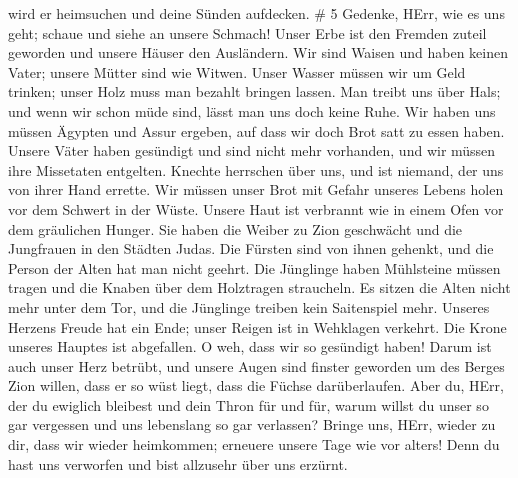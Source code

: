 wird er heimsuchen und deine Sünden aufdecken. \# 5 
Gedenke, HErr, wie es uns geht; schaue und siehe an unsere Schmach!
 Unser Erbe ist den Fremden zuteil geworden und unsere
Häuser den Ausländern.  Wir sind Waisen und haben keinen
Vater; unsere Mütter sind wie Witwen.  Unser Wasser müssen
wir um Geld trinken; unser Holz muss man bezahlt bringen lassen.
 Man treibt uns über Hals; und wenn wir schon müde sind,
lässt man uns doch keine Ruhe.  Wir haben uns müssen Ägypten
und Assur ergeben, auf dass wir doch Brot satt zu essen haben.
 Unsere Väter haben gesündigt und sind nicht mehr vorhanden,
und wir müssen ihre Missetaten entgelten.  Knechte herrschen
über uns, und ist niemand, der uns von ihrer Hand errette. 
Wir müssen unser Brot mit Gefahr unseres Lebens holen vor dem Schwert in
der Wüste.  Unsere Haut ist verbrannt wie in einem Ofen vor
dem gräulichen Hunger.  Sie haben die Weiber zu Zion
geschwächt und die Jungfrauen in den Städten Judas.  Die
Fürsten sind von ihnen gehenkt, und die Person der Alten hat man nicht
geehrt.  Die Jünglinge haben Mühlsteine müssen tragen und
die Knaben über dem Holztragen straucheln.  Es sitzen die
Alten nicht mehr unter dem Tor, und die Jünglinge treiben kein
Saitenspiel mehr.  Unseres Herzens Freude hat ein Ende;
unser Reigen ist in Wehklagen verkehrt.  Die Krone unseres
Hauptes ist abgefallen. O weh, dass wir so gesündigt haben!
 Darum ist auch unser Herz betrübt, und unsere Augen sind
finster geworden  um des Berges Zion willen, dass er so
wüst liegt, dass die Füchse darüberlaufen.  Aber du, HErr,
der du ewiglich bleibest und dein Thron für und für,  warum
willst du unser so gar vergessen und uns lebenslang so gar verlassen?
 Bringe uns, HErr, wieder zu dir, dass wir wieder
heimkommen; erneuere unsere Tage wie vor alters!  Denn du
hast uns verworfen und bist allzusehr über uns erzürnt.
